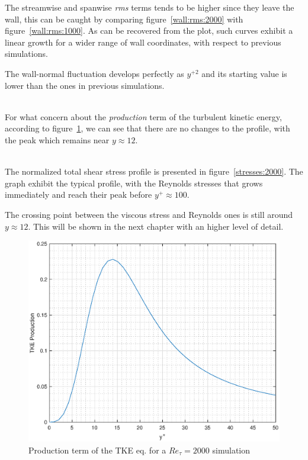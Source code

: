 The streamwise and spanwise \emph{rms} terms tends to be higher since they leave the wall, this can be caught by comparing figure~\ref{wall:rms:2000} with figure~\ref{wall:rms:1000}. As can be recovered from the plot, such curves exhibit a linear growth for a wider range of wall coordinates, with respect to previous simulations. \par
The wall-normal fluctuation develops perfectly as $y^{+2}$ and its starting value is lower than the ones in previous simulations.\\~\par


For what concern about the \emph{production} term of the turbulent kinetic energy, according to figure~\ref{tke:prod:2000}, we can see that there are no changes to the profile, with the peak which remains near $y\approx12$. \\~\par

The normalized total shear stress profile is presented in figure~\ref{stresses:2000}. The graph exhibit the typical profile, with the Reynolds stresses that grows immediately and reach their peak before $y^{+}\approx 100$. \par
The crossing point between the viscous stress and Reynolds ones is still around $y\approx12$. This will be shown in the next chapter with an higher level of detail.


\begin{figure}
\begin{center}
\includegraphics[scale=0.55]{grafici/tke_prod_2000.eps}
\caption{Production term of the TKE eq. for a $Re_{\tau}=2000$ simulation}
\label{tke:prod:2000}
\end{center} 
\end{figure}

